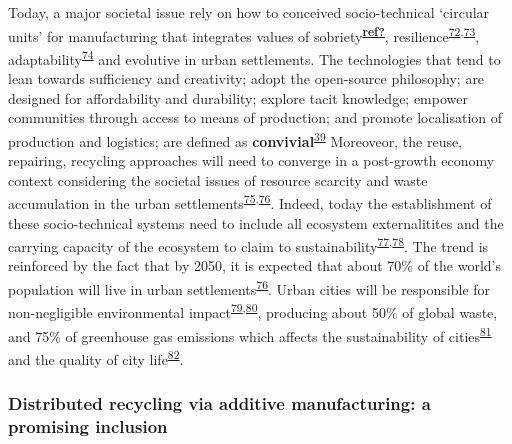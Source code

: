 \documentclass[
  12pt,
  a4paperpaper,
  onecolumn]{article}
\begin{document}
Today, a major societal issue rely on how to conceived socio-technical
`circular units' for manufacturing that integrates values of
sobriety\textsuperscript{\protect\hyperlink{ref-ref}{\textbf{ref?}}},
resilience\textsuperscript{\protect\hyperlink{ref-touriki2021}{72},\protect\hyperlink{ref-VanFan2019}{73}},
adaptability\textsuperscript{\protect\hyperlink{ref-weichhart2021}{74}}
and evolutive in urban settlements. The technologies that tend to lean
towards sufficiency and creativity; adopt the open-source philosophy;
are designed for affordability and durability; explore tacit knowledge;
empower communities through access to means of production; and promote
localisation of production and logistics; are defined as
\textbf{convivial}\textsuperscript{\protect\hyperlink{ref-priavolou2022}{39}}
Moreoveor, the reuse, repairing, recycling approaches will need to
converge in a post-growth economy context considering the societal
issues of resource scarcity and waste accumulation in the urban
settlements\textsuperscript{\protect\hyperlink{ref-kallis2018}{75},\protect\hyperlink{ref-savini2021}{76}}.
Indeed, today the establishment of these socio-technical systems need to
include all ecosystem externalitites and the carrying capacity of the
ecosystem to claim to
sustainability\textsuperscript{\protect\hyperlink{ref-Bakshi2018}{77},\protect\hyperlink{ref-Bakshi2019a}{78}}.
The trend is reinforced by the fact that by 2050, it is expected that
about 70\% of the world's population will live in urban
settlements\textsuperscript{\protect\hyperlink{ref-savini2021}{76}}.
Urban cities will be responsible for non-negligible environmental
impact\textsuperscript{\protect\hyperlink{ref-Zheng2020}{79},\protect\hyperlink{ref-Sodiq2019}{80}},
producing about 50\% of global waste, and 75\% of greenhouse gas
emissions which affects the sustainability of
cities\textsuperscript{\protect\hyperlink{ref-schraven2021}{81}} and the
quality of city
life\textsuperscript{\protect\hyperlink{ref-Riffat2016}{82}}.

\hypertarget{distributed-recycling-via-additive-manufacturing-a-promising-inclusion}{%
\subsubsection{Distributed recycling via additive manufacturing: a
promising
inclusion}\label{distributed-recycling-via-additive-manufacturing-a-promising-inclusion}}
\end{document}
